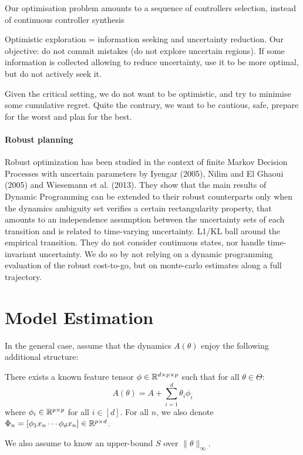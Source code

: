 \documentclass{article}
\begin{document}
Our optimisation problem amounts to a sequence of controllers selection, instead of continuous controller synthesis
    
Optimistic exploration = information seeking and uncertainty reduction. Our objective: do not commit mistakes (do not explore uncertain regions). If some information is collected allowing to reduce uncertainty, use it to be more optimal, but do not actively seek it.

Given the critical setting, we do not want to be optimistic, and try to minimise some cumulative regret. Quite the contrary, we want to be cautious, safe, prepare for the worst and plan for the best. 

\paragraph{Robust planning}
Robust optimization has been studied in the context of finite Markov Decision Processes with uncertain parameters by Iyengar (2005), Nilim and El Ghaoui (2005) and Wiesemann et al. (2013). They show that the main results of Dynamic Programming can be extended to their robust counterparts only when the dynamics ambiguity set verifies a certain rectangularity property, that amounts to an independence assumption between the uncertainty sets of each transition and is related to time-varying uncertainty.
L1/KL ball around the empirical transition.
They do not consider continuous states, nor handle time-invariant uncertainty. We do so by not relying on a dynamic programming evaluation of the robust cost-to-go, but on monte-carlo estimates along a full trajectory.

\section{Model Estimation}

\label{sec:estimation}

In the general case, 
 assume that the dynamics $A(\theta)$ enjoy the following additional structure:
\begin{assumption}[Structure]
\label{assumpt:structure}
There exists a known feature tensor $\phi\in \mathbb{R}^{d \times p \times p}$ such that for all $\theta\in\Theta$:
\begin{equation}
    A(\theta) = A + %
    \sum_{i=1}^d \theta_i\phi_i
\end{equation}
where $\phi_i\in\mathbb{R}^{p\times p}$ for all $i\in[d]$. For all $n$, we also denote $\Phi_n = [\phi_1 x_n \cdots \phi_d x_n]\in\mathbb{R}^{p\times d}$.

We also assume to know an upper-bound $S$ over $\|\theta\|_\infty$.
\end{assumption}
\end{document}
